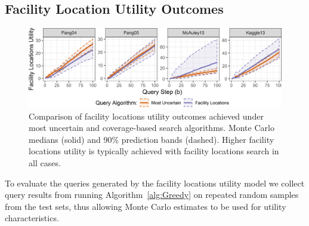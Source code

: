 \documentclass[10pt, conference]{IEEEtran}
\begin{document}
\subsection{Facility Location Utility Outcomes}

\begin{figure}[t]
 \centering
  \includegraphics[width=\textwidth]{flUtilNarrow.png}
  \caption{Comparison of facility locations utility outcomes achieved under most uncertain and coverage-based search algorithms. Monte Carlo medians (solid) and 90\% prediction bands (dashed).  Higher facility locations utility is typically achieved with facility locations search in all cases.}
  \label{fig:flutil}
\end{figure}

To evaluate the queries generated by the facility locations utility model we collect query results from running Algorithm~\ref{alg:Greedy} on repeated random samples from the test sets, thus allowing Monte Carlo estimates to be used for utility characteristics. 
\end{document}
